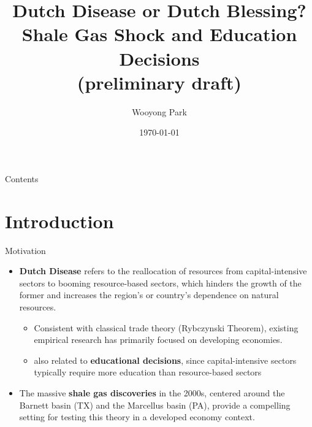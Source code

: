 \documentclass[12pt,  aspectratio=169]{beamer}    %
\title[Shale  Gas  Shock  and  Education  Decisions]{Dutch  Disease  or  Dutch  Blessing?\\  Shale  Gas  Shock  and  Education  Decisions\\  {\footnotesize  (preliminary  draft)}}
\author[Wooyong  Park]{Wooyong  Park}
\institute{Stanford  Graduate  School  of  Business}
\date{\today}
\begin{document}
\begin{frame}
    \titlepage
\end{frame}

\begin{frame}{Contents}
    \tableofcontents
\end{frame}

\section{Introduction}

\begin{frame}{Motivation}

\begin{itemize}
    \item  \textbf{Dutch  Disease}  refers  to  the  reallocation  of  resources  from  capital-intensive  sectors  to  booming  resource-based  sectors,  which  hinders  the  growth  of  the  former  and  increases  the  region’s  or  country’s  dependence  on  natural  resources.
    \begin{itemize}
        \item  Consistent  with  classical  trade  theory  (Rybczynski  Theorem),  existing  empirical  research  has  primarily  focused  on  developing  economies.
        \item  also  related  to  \textbf{educational  decisions},  since  capital-intensive  sectors  typically  require  more  education  than  resource-based  sectors
    \end{itemize}
    \item  The  massive  \textbf{shale  gas  discoveries}  in  the  2000s,  centered  around  the  Barnett  basin  (TX)  and  the  Marcellus  basin  (PA),  provide  a  compelling  setting  for  testing  this  theory  in  a  developed  economy  context.
\end{itemize}
\end{frame}
\end{document}
